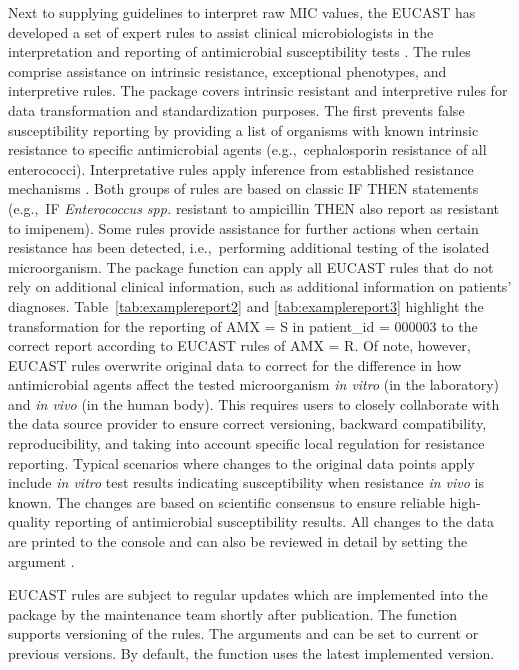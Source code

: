 \documentclass[article, shortnames]{jss}
\newcommand{\fct}[1]{\code{#1()}}
\begin{document}
Next to supplying guidelines to interpret raw MIC values, the EUCAST has
developed a set of expert rules to assist clinical microbiologists in the
interpretation and reporting of antimicrobial susceptibility tests
\citep{Leclercq2013-ml}.  The rules comprise assistance on intrinsic
resistance, exceptional phenotypes, and interpretive rules.  The 
package covers intrinsic resistant and interpretive rules for data
transformation and standardization purposes.  The first prevents false
susceptibility reporting by providing a list of organisms with known
intrinsic resistance to specific antimicrobial agents (e.g.,~cephalosporin
resistance of all enterococci).  Interpretative rules apply inference from
established resistance mechanisms \citep{Winstanley2011-vh,
Courvalin1992-ng, Courvalin1996-fw, Livermore2001-tf}.  Both groups of rules
are based on classic IF THEN statements (e.g.,~IF \emph{Enterococcus spp.}
resistant to ampicillin THEN also report as resistant to imipenem).  Some
rules provide assistance for further actions when certain resistance has
been detected, i.e.,~performing additional testing of the isolated
microorganism.  The  package function \fct{eucast\_rules} can apply
all EUCAST rules that do not rely on additional clinical information, such
as additional information on patients' diagnoses. 
Table~\ref{tab:examplereport2} and \ref{tab:examplereport3} highlight the
transformation for the reporting of AMX = S in patient\_id = 000003 to the
correct report according to EUCAST rules of AMX = R.  Of note, however,
EUCAST rules overwrite original data to correct for the difference in how
antimicrobial agents affect the tested microorganism \emph{in vitro} (in the
laboratory) and \emph{in vivo} (in the human body).  This requires users to
closely collaborate with the data source provider to ensure correct
versioning, backward compatibility, reproducibility, and taking into account
specific local regulation for resistance reporting.  Typical scenarios where
changes to the original data points apply include \emph{in vitro} test
results indicating susceptibility when resistance \emph{in vivo} is known. 
The changes are based on scientific consensus to ensure reliable
high-quality reporting of antimicrobial susceptibility results.  All changes
to the data are printed to the console and can also be reviewed in detail by
setting the argument .

EUCAST rules are subject to regular updates which are implemented into the
 package by the  maintenance team shortly after
publication.  The \fct{eucast\_rules} function supports versioning of the
rules.  The arguments  and
\newline{} can be set to current or previous versions. 
By default, the \newline\fct{eucast\_rules} function uses the latest implemented
version.
\end{document}

